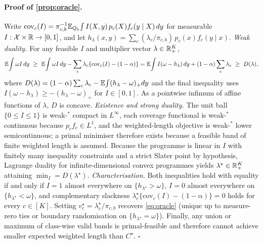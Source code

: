\paragraph{Proof of \cref{prop:oracle}.}
Write $\mathrm{cov}_c(I)=\pi_{c,b}^{-1}\mathbb{E}_{Q_b}\!\int I(X,y)\,p_c(X)f_c(y\mid X)\,dy$ for measurable $I:\mathcal X\times\mathbb{R}\to[0,1]$, and let $h_\lambda(x,y)=\sum_c(\lambda_c/\pi_{c,b})\,p_c(x)f_c(y\mid x)$.
\emph{Weak duality.} For any feasible $I$ and multiplier vector $\lambda\in\mathbb{R}_+^K$,
\[
\E\!\int \omega I\,dy \ \ge\ \E\!\int \omega I\,dy-\sum_c\lambda_c\{\mathrm{cov}_c(I)-(1-\alpha)\}
= \E\!\int I(\omega-h_\lambda)\,dy+(1-\alpha)\sum_c\lambda_c \ \ge\ D(\lambda),
\]
where $D(\lambda)=(1-\alpha)\sum_c\lambda_c-\mathbb{E}\!\int(h_\lambda-\omega)_+dy$ and the final inequality uses $I(\omega-h_\lambda)\ge-(h_\lambda-\omega)_+$ for $I\in[0,1]$.
As a pointwise infimum of affine functions of $\lambda$, $D$ is concave.
\emph{Existence and strong duality.} The unit ball $\{0\le I\le1\}$ is weak-$^*$ compact in $L^\infty$, each coverage functional is weak-$^*$ continuous because $p_cf_c\in L^1$, and the weighted-length objective is weak-$^*$ lower semicontinuous; a primal minimiser therefore exists because a feasible band of finite weighted length is assumed.
Because the programme is linear in $I$ with finitely many inequality constraints and a strict Slater point by hypothesis, Lagrange duality for infinite-dimensional convex programmes \citep[\S8.6, Thm.~1]{luenberger1969optimization} yields $\lambda^\star\in\mathbb{R}_+^K$ attaining $\min_I = D(\lambda^\star)$.
\emph{Characterisation.} Both inequalities hold with equality if and only if $I=1$ almost everywhere on $\{h_{\lambda^\star}>\omega\}$, $I=0$ almost everywhere on $\{h_{\lambda^\star}<\omega\}$, and complementary slackness $\lambda^\star_c\{\mathrm{cov}_c(I)-(1-\alpha)\}=0$ holds for every $c\in[K]$.
Setting $v^\star_c=\lambda^\star_c/\pi_{c,b}$ recovers \cref{eq:oracle} (unique up to measure-zero ties or boundary randomisation on $\{h_{\lambda^\star}=\omega\}$).
Finally, any union or maximum of class-wise valid bands is primal-feasible and therefore cannot achieve smaller expected weighted length than $C^\star$.
\hfill$\square$

